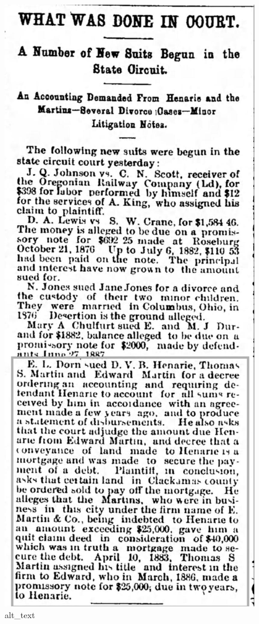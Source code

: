 \documentclass[
  12pt,
]{book}
\begin{document}
\begin{figure}
\centering
\includegraphics{images/0203a_images/image4.jpg}
\caption{alt\_text}
\end{figure}
\end{document}
